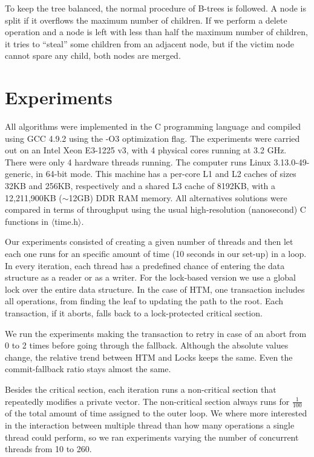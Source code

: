 \documentclass{llncs}
\begin{document}
To keep the tree balanced, the normal procedure of B-trees is followed. A node is split if it overflows the maximum number of children. If we perform a delete operation and a node is left with less than half the maximum number of children, it tries to ``steal'' some children from an adjacent node, but if the victim node cannot spare any child, both nodes are merged.
\vspace{-2mm}
\section{Experiments}
\vspace{-4mm}
All algorithms were implemented in the C programming language and compiled using GCC 4.9.2 using the -O3 optimization flag. The experiments were carried out on an Intel Xeon E3-1225 v3, with 4 physical cores running at 3.2 GHz. There were only 4 hardware threads running. The computer runs Linux 3.13.0-49-generic, in 64-bit mode. This machine has a per-core L1 and L2 caches of sizes 32KB and 256KB, respectively and a shared L3 cache of 8192KB, with a 12,211,900KB ($\sim$12GB) DDR RAM memory. All alternatives solutions were compared in terms of throughput using the usual high-resolution (nanosecond) C functions in $\langle$time.h$\rangle$.

Our experiments consisted of creating a given number of threads and then let each one runs for an specific amount of time (10 seconds in our set-up) in a loop. In every iteration, each thread has a predefined chance of entering the data structure as a reader or as a writer. For the lock-based version we use a global lock over the entire data structure. In the case of HTM, one transaction includes all operations, from finding the leaf to updating the path to the root. Each transaction, if it aborts, falls back to a lock-protected critical section.

We run the experiments making the transaction to retry in case of an abort from 0 to 2 times before going through the fallback. Although the absolute values change, the relative trend between HTM and Locks keeps the same. Even the commit-fallback ratio stays almost the same.

Besides the critical section, each iteration runs a non-critical section that repeatedly modifies a private vector. The non-critical section always runs for $\frac{1}{100}$ of the total amount of time assigned to the outer loop. We where more interested in the interaction between multiple thread than how many operations a single thread could perform, so we ran experiments varying the number of concurrent threads from 10 to 260.
\end{document}
